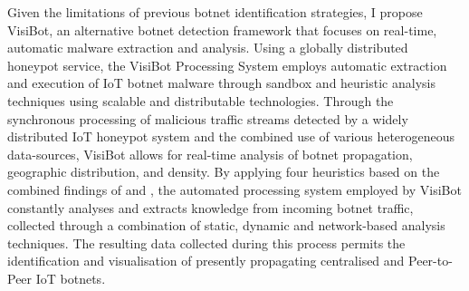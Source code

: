 Given the limitations of previous botnet identification strategies, I propose VisiBot, an alternative botnet detection framework that focuses on real-time, automatic malware extraction and analysis. Using a globally distributed honeypot service, the VisiBot Processing System employs automatic extraction and execution of IoT botnet malware through sandbox and heuristic analysis techniques using scalable and distributable technologies. Through the synchronous processing of malicious traffic streams detected by a widely distributed IoT honeypot system and the combined use of various heterogeneous data-sources, VisiBot allows for real-time analysis of botnet propagation, geographic distribution, and density. By applying four heuristics based on the combined findings of \citet{Bastos2019} and \citet{Herwig2019}, the automated processing system employed by VisiBot constantly analyses and extracts knowledge from incoming botnet traffic, collected through a combination of static, dynamic and network-based analysis techniques. The resulting data collected during this process permits the identification and visualisation of presently propagating centralised and Peer-to-Peer IoT botnets. 